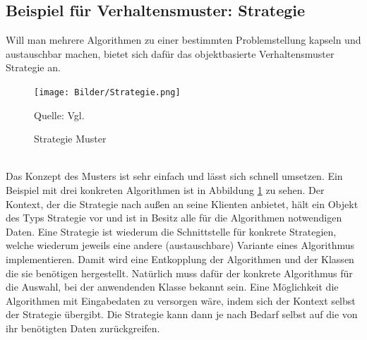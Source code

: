 \documentclass[fontsize=11pt,a4paper,final]{scrreprt}[2003/01/01]
\newcommand*{\quelle}{%
	\footnotesize Quelle: 
}
\begin{document}
\subsection{Beispiel für Verhaltensmuster: Strategie}
Will man mehrere Algorithmen zu einer bestimmten Problemstellung kapseln und austauschbar machen, bietet sich dafür das objektbasierte Verhaltensmuster Strategie an.

\begin{figure}[H]
	\centering
	\texttt{[image: Bilder/Strategie.png]}
	\caption{Strategie Muster}
	\quelle{Vgl. \cite[S. 375]{gamma2004}} 
	\label{fig:Strategie}
\end{figure}
\ \\
Das Konzept des Musters ist sehr einfach und lässt sich schnell umsetzen. Ein Beispiel mit drei konkreten Algorithmen ist in Abbildung \ref{fig:Strategie} zu sehen. Der Kontext, der die Strategie nach außen an seine Klienten anbietet, hält ein Objekt des Typs Strategie vor und ist in Besitz alle für die Algorithmen notwendigen Daten. Eine Strategie ist wiederum die Schnittstelle für konkrete Strategien, welche wiederum jeweils eine andere (austauschbare) Variante eines Algorithmus implementieren. Damit wird eine Entkopplung der Algorithmen und der Klassen die sie benötigen hergestellt. Natürlich muss dafür der konkrete Algorithmus für die Auswahl, bei der anwendenden Klasse bekannt sein. Eine Möglichkeit die Algorithmen mit Eingabedaten zu versorgen wäre, indem sich der Kontext selbst der Strategie übergibt. Die Strategie kann dann je nach Bedarf selbst auf die von ihr benötigten Daten zurückgreifen.
\end{document}
